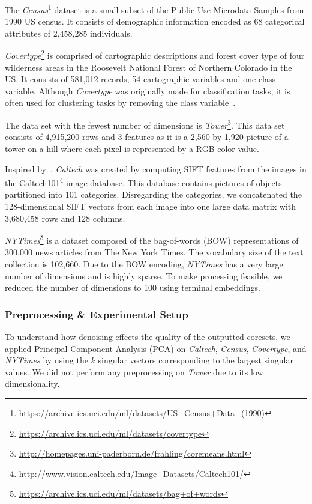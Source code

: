The \textit{Census}\footnote{\url{https://archive.ics.uci.edu/ml/datasets/US+Census+Data+(1990)}} dataset is a small subset of the Public Use Microdata Samples from 1990 US census. It consists of demographic information encoded as 68 categorical attributes of 2,458,285 individuals. 

\textit{Covertype}\footnote{\url{https://archive.ics.uci.edu/ml/datasets/covertype}} is comprised of cartographic descriptions and forest cover type of four wilderness areas in the Roosevelt National Forest of Northern Colorado in the US. It consists of 581,012 records, 54 cartographic variables and one class variable. Although \textit{Covertype} was originally made for classification tasks, it is often used for clustering tasks by removing the class variable~\cite{AckermannMRSLS12}.

The data set with the fewest number of dimensions is \textit{Tower}\footnote{\url{http://homepages.uni-paderborn.de/frahling/coremeans.html}}. This data set consists of 4,915,200 rows and 3 features as it is a 2,560 by 1,920 picture of a tower on a hill where each pixel is represented by a RGB color value. 

Inspired by~\cite{FGSSS13}, \textit{Caltech} was created by computing SIFT features from the images in the Caltech101\footnote{\url{http://www.vision.caltech.edu/Image_Datasets/Caltech101/}} image database. This database contains pictures of objects partitioned into 101 categories. Disregarding the categories, we concatenated the 128-dimensional SIFT vectors from each image into one large data matrix with 3,680,458 rows and 128 columns. 

\textit{NYTimes}\footnote{\url{https://archive.ics.uci.edu/ml/datasets/bag+of+words}} is a dataset composed of the bag-of-words (BOW) representations of 300,000 news articles from The New York Times. The vocabulary size of the text collection is 102,660. Due to the BOW encoding, \textit{NYTimes} has a very large number of dimensions and is highly sparse. To make processing feasible, we reduced the number of dimensions to 100 using terminal embeddings.



\subsubsection*{Preprocessing \& Experimental Setup}
To understand how denoising effects the quality of the outputted coresets, we applied Principal Component Analysis (PCA) on \textit{Caltech}, \textit{Census}, \textit{Covertype}, and \textit{NYTimes} by using the $k$ singular vectors corresponding to the largest singular values. 
We did not perform any preprocessing on \textit{Tower} due to its low dimensionality.

